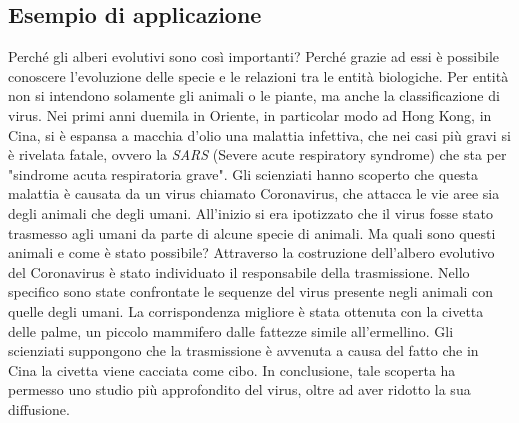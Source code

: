 \subsection*{Esempio di applicazione}
Perché gli alberi evolutivi sono così importanti? Perché grazie ad essi è possibile conoscere l'evoluzione delle specie e le relazioni tra le entità biologiche. Per entità non si intendono solamente gli animali o le piante, ma anche la classificazione di virus.
\newline
Nei primi anni duemila in Oriente, in particolar modo ad Hong Kong, in Cina, si è espansa a macchia d'olio una malattia infettiva, che nei casi più gravi si è rivelata fatale, ovvero la \textit{SARS} (Severe acute respiratory syndrome) che sta per "sindrome acuta respiratoria grave".
\newline
Gli scienziati hanno scoperto che questa malattia è causata da un virus chiamato Coronavirus, che attacca le vie aree sia degli animali che degli umani. All'inizio si era ipotizzato che il virus fosse stato trasmesso agli umani da parte di alcune specie di animali. Ma quali sono questi animali e come è stato possibile?
\newline
Attraverso la costruzione dell'albero evolutivo del Coronavirus è stato individuato il responsabile della trasmissione. Nello specifico sono state confrontate le sequenze del virus presente negli animali con quelle degli umani. La corrispondenza migliore è stata ottenuta con la civetta delle palme, un piccolo mammifero dalle fattezze simile all'ermellino. Gli scienziati suppongono che la trasmissione è avvenuta a causa del fatto che in Cina la civetta viene cacciata come cibo. 
\newline
In conclusione, tale scoperta ha permesso uno studio più approfondito del virus, oltre ad aver ridotto la sua diffusione.

\newpage


